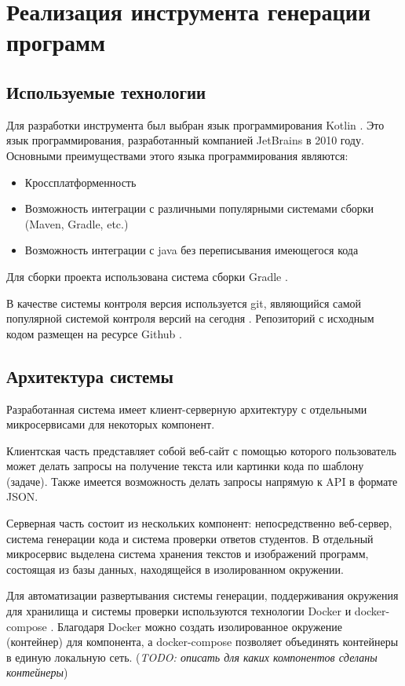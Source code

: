 \section{Реализация инструмента генерации программ}

\subsection{Используемые технологии}

Для разработки инструмента был выбран язык программирования Kotlin \cite{kotlin}. Это язык
программирования, разработанный компанией JetBrains в 2010 году. Основными
преимуществами этого языка программирования являются:
\begin{itemize}
    \item Кроссплатформенность
    \item Возможность интеграции с различными популярными системами сборки
          (Maven, Gradle, etc.)
    \item Возможность интеграции с java без переписывания имеющегося кода
\end{itemize}

Для сборки проекта использована система сборки Gradle \cite{gradle}.

В качестве системы контроля версия используется git, являющийся самой популярной системой
контроля версий на сегодня \cite{git}. Репозиторий с исходным кодом размещен на ресурсе Github
\cite{git} \cite{github} \cite{repo}.


\subsection{Архитектура системы}
Разработанная система имеет клиент-серверную архитектуру с отдельными микросервисами для
некоторых компонент.

Клиентская часть представляет собой веб-сайт с помощью которого пользователь может делать
запросы на получение текста или картинки кода по шаблону (задаче). Также имеется возможность
делать запросы напрямую к API в формате JSON.

Серверная часть состоит из нескольких компонент: непосредственно веб-сервер, система генерации
кода и система проверки ответов студентов. В отдельный микросервис выделена система хранения
текстов и изображений программ, состоящая из базы данных, находящейся в изолированном окружении.

Для автоматизации развертывания системы генерации, поддерживания окружения для хранилища и
системы проверки используются технологии Docker \cite{docker} и docker-compose \cite{docker-compose}.
Благодаря Docker можно создать изолированное окружение (контейнер) для компонента, а docker-compose
позволяет объединять контейнеры в единую локальную сеть.
(\textit{TODO: описать для каких компонентов сделаны контейнеры})

